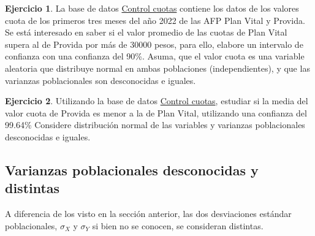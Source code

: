 \documentclass[
  11pt,
]{book}
\theoremstyle{definition}
\theoremstyle{definition}
\theoremstyle{definition}
\newtheorem{exercise}{Ejercicio}[chapter]
\theoremstyle{definition}
\theoremstyle{remark}
\begin{document}
\begin{exercise}
\protect\hypertarget{exr:ICcontrolcuotas}{}\label{exr:ICcontrolcuotas}La base de datos \hyperref[Cuotas]{Control cuotas} contiene los datos de los valores cuota de los primeros tres meses del año 2022 de las AFP Plan Vital y Provida. Se está interesado en saber si el valor promedio de las cuotas de Plan Vital supera al de Provida por más de 30000 pesos, para ello, elabore un intervalo de confianza con una confianza del 90\%. Asuma, que el valor cuota es una variable aleatoria que distribuye normal en ambas poblaciones (independientes), y que las varianzas poblacionales son desconocidas e iguales.
\end{exercise}

\begin{exercise}
Utilizando la base de datos \hyperref[Cuotas]{Control cuotas}, estudiar si la media del valor cuota de Provida es menor a la de Plan Vital, utilizando una confianza del 99.64\% Considere distribución normal de las variables y varianzas poblacionales desconocidas e iguales.
\end{exercise}

\subsection{Varianzas poblacionales desconocidas y distintas}\label{intervalo-de-confianza-para-la-diferencia-de-medias-varianzas-desconocidas-distintas}

A diferencia de los visto en la sección anterior, las dos desviaciones estándar poblacionales, \(\sigma_X\) y \(\sigma_Y\) si bien no se conocen, se consideran distintas.

\begin{table}[H]
\centering
\caption{\label{tab:unnamed-chunk-15}Intervalos de confianza para la diferencia de medias de dos distribucones normales y varianzas poblacionales desconocidas y distintas}
\centering
{}
\end{table}
\end{document}
